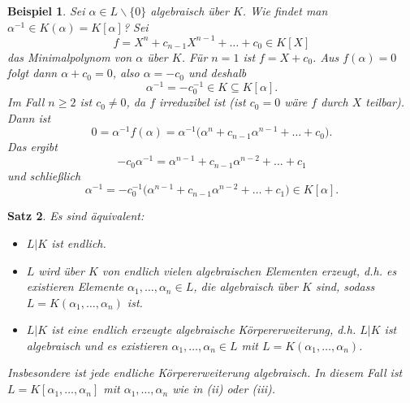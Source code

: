 \documentclass[a4paper, twoside, 11pt, ngerman]{report}
\renewcommand{\setminus}{\smallsetminus}
\theoremstyle{definistyle}
\newtheorem{satz}{Satz}[section]
\newtheorem{bsp}[satz]{Beispiel}
\theoremstyle{remark}
\begin{document}
\begin{bsp}\label{bsp:invers_koerpererweiterung}
Sei $\alpha \in L\setminus\{0\}$ algebraisch über $K$. Wie findet man $\alpha^{-1} \in K(\alpha)=K[\alpha]$?
Sei \[f = X^n + c_{n-1} X^{n-1} + \dots + c_0 \in K[X]\] das Minimalpolynom von $\alpha$ über $K$.
Für $n = 1$ ist $f = X + c_0$. Aus $f(\alpha) = 0$ folgt dann $\alpha + c_0 = 0$, also $\alpha = -c_0$ und deshalb \[\alpha^{-1} = -c_0^{-1} \in K \subseteq K[\alpha].\]
Im Fall $n \geq 2$ ist $c_0 \neq 0$, da $f$ irreduzibel ist (ist $c_0=0$ wäre $f$ durch $X$ teilbar). Dann ist
\[
0 = \alpha^{-1} f(\alpha) = \alpha^{-1} \big(\alpha^n + c_{n-1} \alpha^{n-1} + \dots + c_0 \big).
\]
Das ergibt
\[
-c_0 \alpha^{-1} = \alpha^{n-1} + c_{n-1} \alpha^{n-2} + \dots + c_1
\]
und schließlich
\[
\alpha^{-1} = -c_0^{-1} \big(\alpha^{n-1} + c_{n-1} \alpha^{n-2} + \dots + c_1\big) \in K[\alpha].
\]
\end{bsp}

\begin{satz}\label{satz:endl_erweiterung_aquivalenzen}
Es sind äquivalent:
\begin{itemize}
    \item[(i)] $L|K$ ist endlich.
    \item[(ii)] $L$ wird über $K$ von endlich vielen algebraischen Elementen erzeugt, d.h. es existieren Elemente $\alpha_1, \dots, \alpha_n \in L$, die algebraisch über $K$ sind, sodass $L = K(\alpha_1, \dots, \alpha_n)$ ist.
    \item[(iii)] $L|K$ ist eine endlich erzeugte algebraische Körpererweiterung, d.h. $L|K$ ist algebraisch und es existieren $\alpha_1, \dots, \alpha_n \in L$ mit $L = K(\alpha_1, \dots, \alpha_n)$.
\end{itemize}
Insbesondere ist jede endliche Körpererweiterung algebraisch. In diesem Fall ist $L = K[\alpha_1, \dots, \alpha_n]$ mit $\alpha_1, \dots, \alpha_n$ wie in (ii) oder (iii).
\end{satz}
\end{document}

